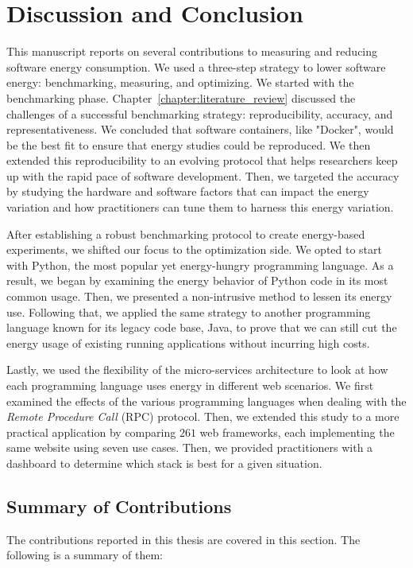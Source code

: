 \clearpage
\chapter{Discussion and Conclusion}
\label{chapter:conclusion}

This manuscript reports on several contributions to measuring and reducing software energy consumption.
We used a three-step strategy to lower software energy: benchmarking, measuring, and optimizing.
We started with the benchmarking phase.
Chapter~\ref{chapter:literature_review} discussed the challenges of a successful benchmarking strategy: reproducibility, accuracy, and representativeness.
We concluded that software containers, like "Docker", would be the best fit to ensure that energy studies could be reproduced.
We then extended this reproducibility to an evolving protocol that helps researchers keep up with the rapid pace of software development.
Then, we targeted the accuracy by studying the hardware and software factors that can impact the energy variation and how practitioners can tune them to harness this energy variation.

After establishing a robust benchmarking protocol to create energy-based experiments, we shifted our focus to the optimization side.
We opted to start with Python, the most popular yet energy-hungry programming language.
As a result, we began by examining the energy behavior of Python code in its most common usage.
Then, we presented a non-intrusive method to lessen its energy use.
Following that, we applied the same strategy to another programming language known for its legacy code base, Java, to prove that we can still cut the energy usage of existing running applications without incurring high costs.

Lastly, we used the flexibility of the micro-services architecture to look at how each programming language uses energy in different web scenarios.
We first examined the effects of the various programming languages when dealing with the \emph{Remote Procedure Call} (RPC) protocol.
Then, we extended this study to a more practical application by comparing $261$ web frameworks, each implementing the same website using seven use cases.
Then, we provided practitioners with a dashboard to determine which stack is best for a given situation.


\section{Summary of Contributions}
\label{section:SummaryofContributions}
The contributions reported in this thesis are covered in this section.
The following is a summary of them:

